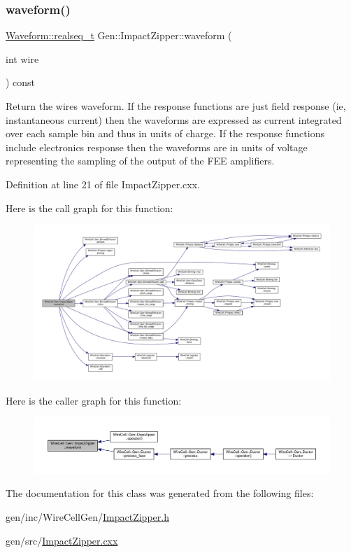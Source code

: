 \subsubsection{\texorpdfstring{waveform()}{waveform()}}
{\footnotesize\ttfamily \hyperlink{namespace_wire_cell_1_1_waveform_a479175e541c8545e87cd8063b74b6956}{Waveform\+::realseq\+\_\+t} Gen\+::\+Impact\+Zipper\+::waveform (\begin{DoxyParamCaption}\item[{int}]{wire }\end{DoxyParamCaption}) const}

Return the wire\textquotesingle{}s waveform. If the response functions are just field response (ie, instantaneous current) then the waveforms are expressed as current integrated over each sample bin and thus in units of charge. If the response functions include electronics response then the waveforms are in units of voltage representing the sampling of the output of the F\+EE amplifiers. 

Definition at line 21 of file Impact\+Zipper.\+cxx.

Here is the call graph for this function\+:
\nopagebreak
\begin{figure}[H]
\begin{center}
\leavevmode
\includegraphics[width=350pt]{class_wire_cell_1_1_gen_1_1_impact_zipper_a542bc19237317cce10742ae097e647ec_cgraph}
\end{center}
\end{figure}
Here is the caller graph for this function\+:
\nopagebreak
\begin{figure}[H]
\begin{center}
\leavevmode
\includegraphics[width=350pt]{class_wire_cell_1_1_gen_1_1_impact_zipper_a542bc19237317cce10742ae097e647ec_icgraph}
\end{center}
\end{figure}


The documentation for this class was generated from the following files\+:\begin{DoxyCompactItemize}
\item 
gen/inc/\+Wire\+Cell\+Gen/\hyperlink{_impact_zipper_8h}{Impact\+Zipper.\+h}\item 
gen/src/\hyperlink{_impact_zipper_8cxx}{Impact\+Zipper.\+cxx}\end{DoxyCompactItemize}
